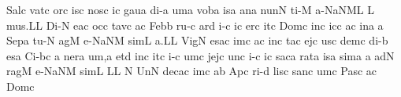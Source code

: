 \spatium
\sgn Sal\punctum c\egn
\sgn vat\punctum c\egn
\sgn {}or\punctum c\egn
\sgn {}is\punctum c\egn
\spatium
\sgn nos\punctum c\egn
{}i{}\punctum c\egn
\spatium
\sgn gau\punctum a\egn
\sgn di-\punctum a\egn
\sgn {}um\punctum a\egn
\spatium
\sgn vob\punctum a\egn
\sgn {}is\punctum a\egn
\spatium
\sgn {}an\punctum a\egn
\sgn nun\punctum N\egn
\sgn ti-\punctum M\egn
\sgn {}a-\pessubbipunctis NaNM\nonspatium\punctuminclinatum L\egn
\custos L
\lineaproxima
\sgn mu{s.}\punctum L\augmentum L\egn
\spatium
\divisiofinalis
\spatium
\sgn Di-\punctum N\egn
\sgn {}e{}\pes ac\egn
\spatium
\sgn {}oc\punctum c\egn
\sgn tav\punctum c\egn
\sgn {}a{}\punctum c\egn
\spatium
\sgn Feb\punctum b\egn
\sgn ru-\punctum c\egn
\sgn {}ar\punctum d\egn
\sgn {}i-\punctum c\egn
\sgn {}i{}\punctum c\egn
\spatium
\sgn {}er\punctum c\egn
\sgn {}it\punctum c\egn
\spatium
\sgn Dom\punctum c\egn
\sgn {}in\punctum c\egn
\sgn {}ic\punctum c\egn
\sgn {}a{}\punctum c\egn
\spatium
\sgn {}in\punctum a\egn
\spatium
\custos a
\lineaproxima
\sgn Sep\punctum a\egn
\sgn tu-\punctum N\egn
\sgn {}ag\punctum M\egn
\sgn {}e-\pessubbipunctis NaNM\egn
\sgn sim\punctum L\egn
\sgn {}a.\punctum L\augmentum L\egn
\spatium
\divisiofinalis
\spatium
\sgn Vig\punctum N\egn
\sgn {}es\pes ac\egn
\sgn {}im\punctum c\egn
\sgn {}a{}\punctum c\egn
\spatium
{}in\punctum c\egn 
\sgn ta{}\punctum c\egn
\spatium
\sgn {}ej\punctum c\egn
\sgn {}us\punctum c\egn
\sgn dem\punctum c\egn
\spatium
\sgn di-\punctum b\egn
\sgn {}es\punctum a\egn
\spatium
\sgn Ci-\pes bc\egn
\custos a
\lineaproxima
\sgn ner\punctum a\egn
\sgn {}u{m,}\punctum a\egn
\spatium
\divisiominima
\spatium
\sgn {}et\punctum d\egn
\spatium
\sgn {}in\punctum c\egn
\sgn {}it\punctum c\egn
\sgn {}i-\punctum c\egn
\sgn {}um\punctum c\egn
\spatium
\sgn jej\punctum c\egn
\sgn {}un\punctum c\egn
\sgn {}i-\punctum c\egn
\sgn {}i{}\punctum c\egn
\spatium
\sgn sac\punctum a\egn
\sgn rat\punctum a\egn
\sgn {}is\punctum a\egn
\sgn sim\punctum a\egn
\sgn {}{\ae}{}\punctum a\egn
\spatium
{}ad\punctum N\egn
\sgn rag\punctum M\egn
\sgn {}e-\pessubbipunctis NaNM\egn
\sgn sim\punctum L\egn
\sgn {}{\ae}{}\punctum L\augmentum L\egn
\spatium
\divisiofinalis
\spatium
\custos N
\lineaproxima
\sgn {}Un\punctum N\egn
\sgn dec\pes ac\egn
\sgn {}im\punctum c\egn
\sgn {}a{}\punctum b\egn
\spatium
\sgn {}Ap\punctum c\egn
\sgn ri-\punctum d\egn
\sgn lis\punctum c\egn
\spatium
\sgn san\punctum c\egn
{}um\punctum c\egn
\spatium
\sgn Pas\punctum c\egn
{}a{}\punctum c\egn
\spatium
\sgn Dom\punctum c\egn

